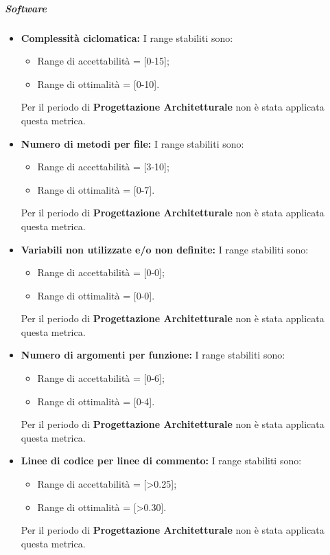 \subparagraph{Software}
\begin{itemize}
\item \textbf{Complessità ciclomatica: }I range stabiliti sono:
      \begin{itemize}
        \item Range di accettabilità = [0-15];
        \item Range di ottimalità = [0-10].
      \end{itemize}
Per il periodo di \textbf{Progettazione Architetturale} non è stata applicata questa metrica.

\item \textbf{Numero di metodi per file: }I range stabiliti sono:
      \begin{itemize}
        \item Range di accettabilità = [3-10];
        \item Range di ottimalità = [0-7].
      \end{itemize}
Per il periodo di \textbf{Progettazione Architetturale} non è stata applicata questa metrica.

\item \textbf{Variabili non utilizzate e/o non definite: }I range stabiliti sono:
      \begin{itemize}
        \item Range di accettabilità = [0-0];
        \item Range di ottimalità = [0-0].
      \end{itemize}
Per il periodo di \textbf{Progettazione Architetturale} non è stata applicata questa metrica.

\item \textbf{Numero di argomenti per funzione: }I range stabiliti sono:
      \begin{itemize}
        \item Range di accettabilità = [0-6];
        \item Range di ottimalità = [0-4].
      \end{itemize}
Per il periodo di \textbf{Progettazione Architetturale} non è stata applicata questa metrica.

\item \textbf{Linee di codice per linee di commento: } I range stabiliti sono:
      \begin{itemize}
        \item Range di accettabilità = [>0.25];
        \item Range di ottimalità = [>0.30].
      \end{itemize}
Per il periodo di \textbf{Progettazione Architetturale} non è stata applicata questa metrica.
\end{itemize}

